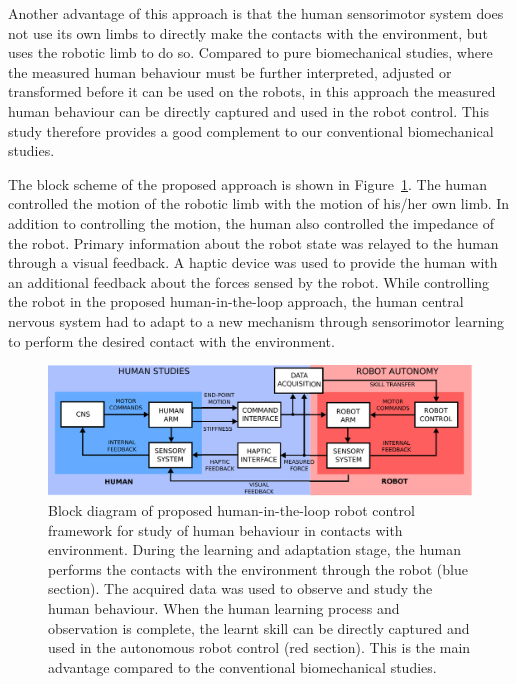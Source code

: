\documentclass[final,5p,twocolumn]{elsarticle}
\begin{document}
Another advantage of this approach is that the human sensorimotor system does not use its own limbs to directly make the contacts with the environment, but uses the robotic limb to do so. Compared to pure biomechanical studies, where the measured human behaviour must be further interpreted, adjusted or transformed before it can be used on the robots, in this approach the measured human behaviour can be directly captured and used in the robot control. This study therefore provides a good complement to our conventional biomechanical studies.

The block scheme of the proposed approach is shown in Figure~\ref{fig:scheme}. The human controlled the motion of the robotic limb with the motion of his/her own limb. In addition to controlling the motion, the human also controlled the impedance of the robot. Primary information about the robot state was relayed to the human through a visual feedback. A haptic device was used to provide the human with an additional feedback about the forces sensed by the robot. While controlling the robot in the proposed human-in-the-loop approach, the human central nervous system had to adapt to a new mechanism through sensorimotor learning to perform the desired contact with the environment.
\begin{figure}[!t]
  \centering
  \includegraphics[width=\linewidth]{images/scheme.pdf}
  \caption{Block diagram of proposed human-in-the-loop robot control framework for study of human behaviour in contacts with environment. During the learning and adaptation stage, the human performs the contacts with the environment through the robot (blue section). The acquired data was used to observe and study the human behaviour. When the human learning process and observation is complete, the learnt skill can be directly captured and used in the autonomous robot control (red section). This is the main advantage compared to the conventional biomechanical studies.}
  \label{fig:scheme}
\end{figure}
\end{document}
